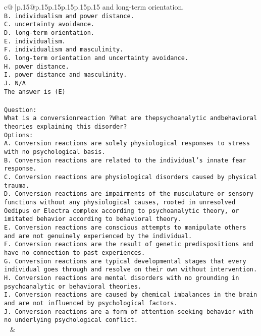 \documentclass{article}
\begin{document}
{\begin{supertabular}{c@{$\;$}|p{.15\linewidth}@{}p{.15\linewidth}p{.15\linewidth}p{.15\linewidth}p{.15\linewidth}p{.15\linewidth}}
{{{and long-term orientation.\\ \tt B. individualism and power distance.\\ \tt C. uncertainty avoidance.\\ \tt D. long-term orientation.\\ \tt E. individualism.\\ \tt F. individualism and masculinity.\\ \tt G. long-term orientation and uncertainty avoidance.\\ \tt H. power distance.\\ \tt I. power distance and masculinity.\\ \tt J. N/A\\ \tt The answer is (E)\\ \tt \\ \tt Question:\\ \tt What is a conversionreaction ?What are thepsychoanalytic andbehavioral theories explaining this disorder?\\ \tt Options:\\ \tt A. Conversion reactions are solely physiological responses to stress with no psychological basis.\\ \tt B. Conversion reactions are related to the individual's innate fear response.\\ \tt C. Conversion reactions are physiological disorders caused by physical trauma.\\ \tt D. Conversion reactions are impairments of the musculature or sensory functions without any physiological causes, rooted in unresolved Oedipus or Electra complex according to psychoanalytic theory, or imitated behavior according to behavioral theory.\\ \tt E. Conversion reactions are conscious attempts to manipulate others and are not genuinely experienced by the individual.\\ \tt F. Conversion reactions are the result of genetic predispositions and have no connection to past experiences.\\ \tt G. Conversion reactions are typical developmental stages that every individual goes through and resolve on their own without intervention.\\ \tt H. Conversion reactions are mental disorders with no grounding in psychoanalytic or behavioral theories.\\ \tt I. Conversion reactions are caused by chemical imbalances in the brain and are not influenced by psychological factors.\\ \tt J. Conversion reactions are a form of attention-seeking behavior with no underlying psychological conflict.\\ \tt  
	  } 
	   } 
	   } 
	 & \\ 
 


\end{supertabular}}
\end{document}

